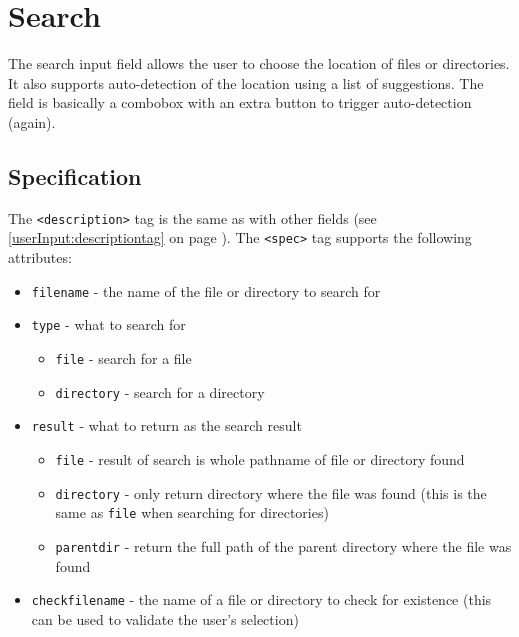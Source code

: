 \section{Search}

The search input field allows the user to choose the location of files or
directories. It also supports auto-detection of the location using a list of 
suggestions. The field is basically a combobox with an extra button to
trigger auto-detection (again).

\begin{center}
\end{center}

\subsection{Specification}

The \texttt{<description>} tag is the same as with other fields (see
\ref{userInput:descriptiontag} on page \pageref{userInput:descriptiontag}). The
\texttt{<spec>} tag supports the following attributes:

\begin{itemize}
\item \texttt{filename} - the name of the file or directory to search for
\item \texttt{type} - what to search for
  \begin{itemize}
  \item \texttt{file} - search for a file
  \item \texttt{directory} - search for a directory
  \end{itemize}
\item \texttt{result} - what to return as the search result
  \begin{itemize}
  \item \texttt{file} - result of search is whole pathname of file or directory found
  \item \texttt{directory} - only return directory where the file was found (this is the same as \texttt{file} when searching for directories)
  \item \texttt{parentdir} - return the full path of the parent directory where the file was found
  \end{itemize}
\item \texttt{checkfilename} - the name of a file or directory to check for existence (this can be used to validate the user's selection)
\end{itemize}

